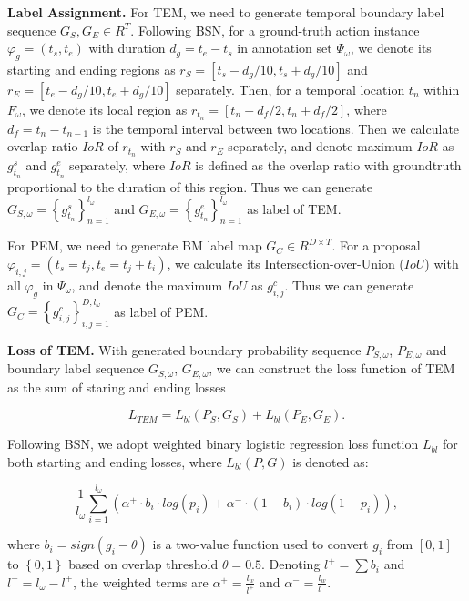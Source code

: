 \documentclass[10pt,twocolumn,letterpaper]{article}
\begin{document}
\noindent
\textbf{Label Assignment.}
For TEM, we need to generate temporal boundary label sequence $G_S, G_E \in R^T$.
%
Following BSN\cite{lin2018bsn}, for a ground-truth action instance $\varphi_g=( t_{s},t_{e} )$ with duration $d_g=t_e-t_s$ in annotation set $\Psi_{\omega}$, we denote its starting and ending regions as $r_S=[ t_s-d_g/10,t_s+d_g/10 ]$ and $r_E= [ t_e-d_g/10,t_e+d_g/10 ]$ separately. 
%
Then, for a temporal location $t_n$ within $F_{\omega}$, we denote its local region as $r_{t_n}=[ t_n-d_f/2,t_n+d_f/2 ]$, where $d_f=t_{n}-t_{n-1}$ is the temporal interval between two locations. 
%
Then we calculate overlap ratio $IoR$ of $r_{t_n}$ with $r_S$ and $r_E$ separately, and denote maximum $IoR$ as $g^s_{t_n}$ and $g^e_{t_n}$ separately, where $IoR$ is defined as the overlap
ratio with groundtruth proportional to the duration of this region.
%
Thus we can generate $G_{S,\omega} = \left \{ g^s_{t_n} \right \}_{n=1}^{l_{\omega }} $
 and $G_{E,\omega} = \left \{ g^e_{t_n} \right \}_{n=1}^{l_{\omega }} $ as label of TEM.


For PEM, we need to generate BM  label map $G_C \in R^{D \times T}$.
%
For a proposal $\varphi_{i,j} =(t_s = t_j, t_e = t_j + t_i)$, we calculate its Intersection-over-Union ($IoU$) with all $\varphi_g$ in $\Psi_{\omega}$, and denote the maximum $IoU$ as $g^c_{i,j}$.
%
Thus we can generate $G_C = \left \{ g^c_{i,j} \right \}_{i,j=1}^{D,l_{\omega }} $ as label of PEM.

\noindent
\textbf{Loss of TEM.}
With generated boundary probability sequence $P_{S,\omega}$, $P_{E,\omega}$ and boundary label sequence $G_{S,\omega}$, $G_{E,\omega}$, we can construct the  loss function of TEM  as the sum of staring and ending losses

\begin{equation}
L_{TEM}= L_{bl}(P_{S},G_{S})+   L_{bl}(P_{E},G_{E}).
\end{equation}

Following BSN\cite{lin2018bsn}, we adopt weighted binary logistic regression loss function $L_{bl}$ for both starting and ending losses, where $L_{bl}(P,G)$ is denoted as:

\begin{small}
\begin{equation}
\frac{1}{l_\omega}\sum_{i=1}^{l_\omega} \left (\alpha^{+}\cdot b_i\cdot  log(p_i)+\alpha^{-} \cdot (1-b_i) \cdot log(1-p_i) \right ),
\end{equation}
\end{small}
where $b_i=sign(g_i-\theta)$ is a two-value function used to convert  $g_i$ from $[ 0,1 ]$ to $\left \{0,1  \right \}$ based on  overlap threshold $\theta = 0.5$.  
% 
Denoting $l^+=\sum b_i$ and $l^-=l_\omega -l^+ $, the weighted terms are $\alpha^+=\frac{l_w}{l^+}$ and $\alpha^-=\frac{l_w}{l^-}$.
\end{document}
